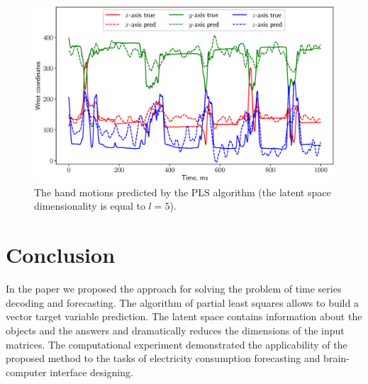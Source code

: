 \documentclass[12pt,twoside]{article}
\begin{document}
\begin{figure}[!h]
	\centering
	\includegraphics[width=\textwidth]{figs/ecog_prediction}
	\caption{The hand motions predicted by the PLS algorithm (the latent space dimensionality is equal to $l=5$).}
	\label{fig::ecog_prediction}
\end{figure}

\section{Conclusion}
In the paper we proposed the approach for solving the problem of time series decoding and forecasting. 
The algorithm of partial least squares allows to build a vector target variable prediction. 
The latent space contains information about the objects and the answers and dramatically reduces the dimensions of the input matrices. 
The computational experiment demonstrated the applicability of the proposed method to the tasks of electricity consumption forecasting and brain-computer interface designing.



\end{document}
